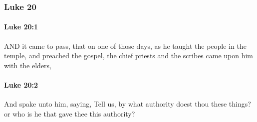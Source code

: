 	\subsubsection{Luke 20} %
		\label{LUKE-20}
		
		\paragraph{Luke 20:1} %
			\label{LUKE-20-1}

			AND it came to pass, that on one of those days, as he taught the people in the temple, and preached the gospel, the chief priests and the scribes came upon him with the elders,

			\begin{framed}
			\scriptsize
				\begin{compactdesc}
					\item[SBLG] 
				\end{compactdesc}
			\end{framed}

		\paragraph{Luke 20:2} %
			\label{LUKE-20-2}

			And spake unto him, saying, Tell us, by what authority doest thou these things? or who is he that gave thee this authority?

